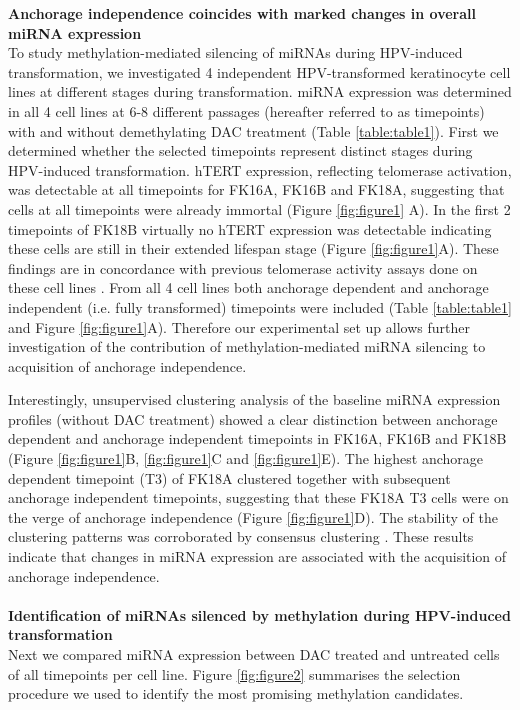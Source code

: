 \textbf{Anchorage independence coincides with marked changes in overall miRNA expression}
\\
To study methylation-mediated silencing of miRNAs during HPV-induced transformation, we investigated 4 independent HPV-transformed keratinocyte cell lines at different stages during transformation. miRNA expression was determined in all 4 cell lines at 6-8 different passages (hereafter referred to as timepoints) with and without demethylating DAC treatment (Table \ref{table:table1}). First we determined whether the selected timepoints represent distinct stages during HPV-induced transformation. hTERT expression, reflecting telomerase activation, was detectable at all timepoints for FK16A, FK16B and FK18A, suggesting that cells at all timepoints were already immortal (Figure \ref{fig:figure1} A). In the first 2 timepoints of FK18B virtually no hTERT expression was detectable indicating these cells are still in their extended lifespan stage (Figure \ref{fig:figure1}A). These findings are in concordance with previous telomerase activity assays done on these cell lines \cite{Steenbergen1996}. From all 4 cell lines both anchorage dependent and anchorage independent (i.e. fully transformed) timepoints were included (Table \ref{table:table1} and Figure \ref{fig:figure1}A). Therefore our experimental set up allows further investigation of the contribution of methylation-mediated miRNA silencing to acquisition of anchorage independence. 

Interestingly, unsupervised clustering analysis of the baseline miRNA expression profiles (without DAC treatment) showed a clear distinction between anchorage dependent and anchorage independent timepoints in FK16A, FK16B and FK18B (Figure \ref{fig:figure1}B, \ref{fig:figure1}C and \ref{fig:figure1}E). The highest anchorage dependent timepoint (T3) of FK18A clustered together with subsequent anchorage independent timepoints, suggesting that these FK18A T3 cells were on the verge of anchorage independence (Figure \ref{fig:figure1}D). The stability of the clustering patterns was corroborated by consensus clustering \cite{Monti2003}. These results indicate that changes in miRNA expression are associated with the acquisition of anchorage independence.  
\\
\\
\textbf{Identification of miRNAs silenced by methylation during HPV-induced transformation}
\\
Next we compared miRNA expression between DAC treated and untreated cells of all timepoints per cell line. Figure \ref{fig:figure2} summarises the selection procedure we used to identify the most promising methylation candidates. 

